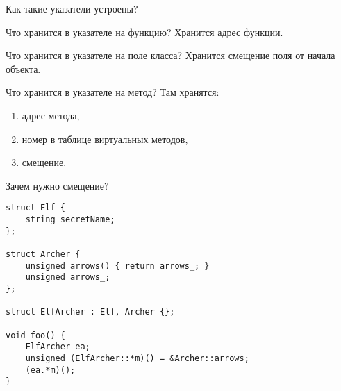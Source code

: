 \documentclass[aspectration=1610,t]{beamer}
\begin{document}
%
%

\begin{frame}[fragile]{Как такие указатели устроены?}
    \pause
    \begin{block}{Что хранится в указателе на функцию?}
        \pause Хранится адрес функции.
    \end{block}

    \pause
    \begin{block}{Что хранится в указателе на поле класса?}
        \pause
        Хранится смещение поля от начала объекта.
    \end{block}

    \pause
    \begin{block}{Что хранится в указателе на метод?}
        \pause
        Там хранятся:
        \begin{enumerate}
            \pause\item адрес метода,
            \pause\item номер в таблице виртуальных методов,
            \pause\item смещение.
        \end{enumerate}
    \end{block}
\end{frame}

\begin{frame}[fragile]{Зачем нужно смещение?}
\begin{lstlisting}
struct Elf {
    string secretName;
};

struct Archer {
    unsigned arrows() { return arrows_; }
    unsigned arrows_;
};

struct ElfArcher : Elf, Archer {};

void foo() {
    ElfArcher ea;
    unsigned (ElfArcher::*m)() = &Archer::arrows;   
    (ea.*m)();
}
\end{lstlisting}
\end{frame}
\end{document}
